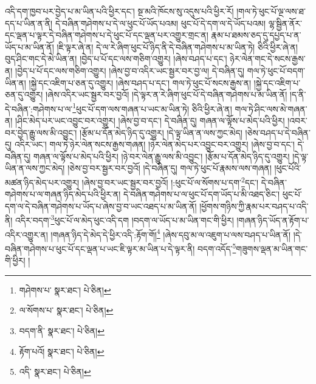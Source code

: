 འདི་དག་ཁྱབ་པར་བྱེད་པ་མ་ཡིན་པའི་ཕྱིར་དང་། སྔ་མའི་ཁོངས་སུ་འདུས་པའི་ཕྱིར་རོ། །གལ་ཏེ་ཕུང་པོ་ལྔ་ལས་ཐ་དད་པ་ཡིན་ན་ནི། དེ་བཞིན་གཤེགས་པ་དེ་ལ་ཕུང་པོ་ཡོད་པའམ། ཕུང་པོ་དེ་དག་ལ་དེ་ཡོད་པའམ། ལྷ་སྦྱིན་ནོར་དང་ལྡན་པ་ལྟར་དེ་བཞིན་གཤེགས་པ་དེ་ཕུང་པོ་དང་ལྡན་པར་འགྱུར་གྲང་ན། རྣམ་པ་ཐམས་ཅད་དུ་དཔྱད་པ་ན་ཡོད་པ་མ་ཡིན་ནོ། །ཇི་ལྟར་ཞེ་ན། དེ་ལ་རེ་ཞིག་ཕུང་པོ་ཉིད་ནི་དེ་བཞིན་གཤེགས་པ་མ་ཡིན་ཏེ། ཅིའི་ཕྱིར་ཞེ་ན། བུད་ཤིང་གང་དེ་མེ་ཡིན་ན། །བྱེད་པ་པོ་དང་ལས་གཅིག་འགྱུར། །ཞེས་བཤད་པ་དང་། ཉེར་ལེན་གང་དེ་སངས་རྒྱས་ན། །བྱེད་པ་པོ་དང་ལས་གཅིག་འགྱུར། །ཞེས་བྱ་བ་འདིར་ཡང་སྦྱར་བར་བྱ་ལ། དེ་བཞིན་དུ། གལ་ཏེ་ཕུང་པོ་བདག་ཡིན་ན། །སྐྱེ་དང་འཇིག་པ་ཅན་དུ་འགྱུར། །ཞེས་བཤད་པ་དང་། གལ་ཏེ་ཕུང་པོ་སངས་རྒྱས་ན། །སྐྱེ་དང་འཇིག་པ་ཅན་དུ་འགྱུར། །ཞེས་འདིར་ཡང་སྦྱར་བར་བྱའོ། །དེ་ལྟར་ན་རེ་ཞིག་ཕུང་པོ་དེ་བཞིན་གཤེགས་པ་མ་ཡིན་ནོ། །ད་ནི་དེ་བཞིན་:གཤེགས་པ་ལ་\footnote{གཤེགས་པ་  སྣར་ཐང་།  པེ་ཅིན། }ཕུང་པོ་དག་ལས་གཞན་པ་ཡང་མ་ཡིན་ཏེ། ཅིའི་ཕྱིར་ཞེ་ན། གལ་ཏེ་ཤིང་ལས་མེ་གཞན་ན། །ཤིང་མེད་པར་ཡང་འབྱུང་བར་འགྱུར། །ཞེས་བྱ་བ་དང་། དེ་བཞིན་དུ། གཞན་ལ་ལྟོས་པ་མེད་པའི་ཕྱིར། །འབར་བར་བྱེད་རྒྱུ་ལས་མི་འབྱུང་། །རྩོམ་པ་དོན་མེད་ཉིད་དུ་འགྱུར། །དེ་ལྟ་ཡིན་ན་ལས་ཀྱང་མེད། །ཅེས་བཤད་པ་དེ་བཞིན་དུ། འདིར་ཡང་། གལ་ཏེ་ཉེར་ལེན་སངས་རྒྱས་གཞན། །ཉེར་ལེན་མེད་པར་འབྱུང་བར་འགྱུར། །ཞེས་བྱ་བ་དང་། དེ་བཞིན་དུ། གཞན་ལ་ལྟོས་པ་མེད་པའི་ཕྱིར། །ཉེ་བར་ལེན་རྒྱུ་ལས་མི་འབྱུང་། །རྩོམ་པ་དོན་མེད་ཉིད་དུ་འགྱུར། །དེ་ལྟ་ཡིན་ན་ལས་ཀྱང་མེད། །ཅེས་བྱ་བར་སྦྱར་བར་བྱའོ། །དེ་བཞིན་དུ། གལ་ཏེ་ཕུང་པོ་རྣམས་ལས་གཞན། །ཕུང་པོའི་མཚན་ཉིད་མེད་པར་འགྱུར། །ཞེས་བྱ་བར་ཡང་སྦྱར་བར་བྱའོ། །:ཕུང་པོ་ལ་སོགས་པ་དག་\footnote{ལ་སོགས་པ་  སྣར་ཐང་།  པེ་ཅིན། }དང་། དེ་བཞིན་གཤེགས་པ་ལ་གཞན་ཉིད་མེད་པའི་ཕྱིར་ན། དེ་བཞིན་གཤེགས་པ་ལ་ཕུང་པོ་དག་ཡོད་པ་མི་འཐད་ཅིང་། ཕུང་པོ་དག་ལ་དེ་བཞིན་གཤེགས་པ་ཡོད་པ་ཞེས་བྱ་བ་ཡང་འཐད་པ་མ་ཡིན་ནོ། །ཕྱོགས་གཉིས་ཀྱི་རྣམ་པར་བཤད་པ་འདི་ནི། འདིར་བདག་\footnote{བདག་ནི་  སྣར་ཐང་།  པེ་ཅིན། }ཕུང་པོ་ལ་མེད་ཕུང་འདི་དག །བདག་ལ་ཡོད་པ་མ་ཡིན་གང་གི་ཕྱིར། །གཞན་ཉིད་ཡོད་ན་རྟོག་པ་འདིར་འགྱུར་ན། །གཞན་ཉིད་དེ་མེད་དེ་ཕྱིར་འདི་:རྟོག་གོ།\footnote{རྟོག་པའོ།  སྣར་ཐང་།  པེ་ཅིན། } །ཞེས་དབུ་མ་ལ་འཇུག་པ་ལས་བཤད་པ་ཡིན་ནོ། །དེ་བཞིན་གཤེགས་པ་ཕུང་པོ་དང་ལྡན་པ་ཡང་ཇི་ལྟར་མ་ཡིན་པ་དེ་ལྟར་ནི། བདག་འདོད་\footnote{འདི་  སྣར་ཐང་།  པེ་ཅིན། }གཟུགས་ལྡན་མ་ཡིན་གང་གི་ཕྱིར། །
